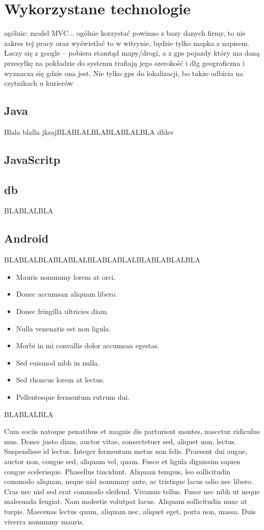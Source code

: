 \documentclass[eng,printmode,oneside]{mgr}
\begin{document}
\chapter{Wykorzystane technologie}
ogólnie: model MVC...
	ogólnie korzystać powinno z bazy danych firmy, to nie zakres tej pracy oraz wyświetlać to w  witrynie, będzie tylko mapka z napisem. Łaczy się z google – 
	pobiera stamtąd mapy/drogi, a z gps pojazdy który ma daną przesyłkę na pokładzie do systemu trafiają jego szerokość i dłg geograficzna i wyznacza się 
	gdzie ona jest.
	Nie tylko gps do lokalizacji, bo także odbicia na czytnikach u kurierów 

\section{Java}
Blala blalla jksajBLABLALBLABLABLALBLA 
dfdsv
\section{JavaScritp}
\section{db}

BLABLALBLA
\section{Android}
BLABLALBLABLABLALBLABLABLALBLABLABLALBLA 

\begin{itemize}
\item Mauris nonummy lorem at orci.
\item Donec accumsan aliquam libero.
\item Donec fringilla ultricies diam.
\item Nulla venenatis est non ligula.
\item Morbi in mi convallis dolor accumsan egestas.
\item Sed euismod nibh in nulla.
\item Sed rhoncus lorem at lectus.
\item Pellentesque fermentum rutrum dui.
\end{itemize}
BLABLALBLA 

Cum sociis natoque penatibus et magnis dis parturient montes, nascetur ridiculus mus. Donec justo diam, auctor vitae, consectetuer sed, aliquet non, lectus. 
Suspendisse id lectus. Integer fermentum metus non felis. Praesent dui augue, auctor non, congue sed, aliquam vel, quam. Fusce et ligula dignissim sapien 
congue scelerisque. Phasellus tincidunt. Aliquam tempus, leo sollicitudin commodo aliquam, neque nisl nonummy ante, ac tristique lacus odio nec libero. Cras 
nec nisl sed erat commodo eleifend. Vivamus tellus. Fusce nec nibh ut neque malesuada feugiat. Nam molestie volutpat lacus. Aliquam sollicitudin nunc at 
turpis. Maecenas lectus quam, aliquam nec, aliquet eget, porta non, massa. Duis viverra nonummy mauris.
\end{document}
